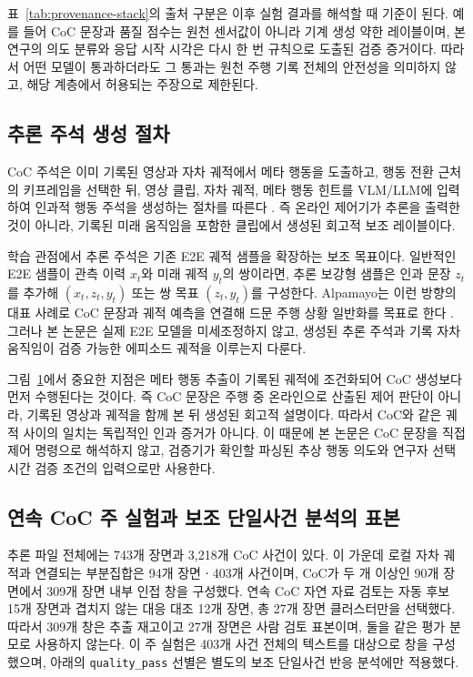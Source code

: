 표~\ref{tab:provenance-stack}의 출처 구분은 이후 실험 결과를 해석할 때 기준이 된다. 예를 들어 CoC 문장과 품질 점수는 원천 센서값이 아니라 기계 생성 약한 레이블이며, 본 연구의 의도 분류와 응답 시작 시각은 다시 한 번 규칙으로 도출된 검증 증거이다. 따라서 어떤 모델이 통과하더라도 그 통과는 원천 주행 기록 전체의 안전성을 의미하지 않고, 해당 계층에서 허용되는 주장으로 제한된다.

\subsection{추론 주석 생성 절차}
CoC 주석은 이미 기록된 영상과 자차 궤적에서 메타 행동을 도출하고, 행동 전환 근처의 키프레임을 선택한 뒤, 영상 클립, 자차 궤적, 메타 행동 힌트를 VLM/LLM에 입력하여 인과적 행동 주석을 생성하는 절차를 따른다 \cite{nvidia2026autolabeler}. 즉 온라인 제어기가 추론을 출력한 것이 아니라, 기록된 미래 움직임을 포함한 클립에서 생성된 회고적 보조 레이블이다.

\begin{figure}[t]
\centering

\label{fig:annotation-flow}
\end{figure}

학습 관점에서 추론 주석은 기존 E2E 궤적 샘플을 확장하는 보조 목표이다. 일반적인 E2E 샘플이 관측 이력 $x_t$와 미래 궤적 $y_t$의 쌍이라면, 추론 보강형 샘플은 인과 문장 $z_t$를 추가해 $(x_t,z_t,y_t)$ 또는 쌍 목표 $(z_t,y_t)$를 구성한다. Alpamayo는 이런 방향의 대표 사례로 CoC 문장과 궤적 예측을 연결해 드문 주행 상황 일반화를 목표로 한다 \cite{wang2025alpamayo}. 그러나 본 논문은 실제 E2E 모델을 미세조정하지 않고, 생성된 추론 주석과 기록 자차 움직임이 검증 가능한 에피소드 궤적을 이루는지 다룬다.

그림~\ref{fig:annotation-flow}에서 중요한 지점은 메타 행동 추출이 기록된 궤적에 조건화되어 CoC 생성보다 먼저 수행된다는 것이다. 즉 CoC 문장은 주행 중 온라인으로 산출된 제어 판단이 아니라, 기록된 영상과 궤적을 함께 본 뒤 생성된 회고적 설명이다. 따라서 CoC와 같은 궤적 사이의 일치는 독립적인 인과 증거가 아니다. 이 때문에 본 논문은 CoC 문장을 직접 제어 명령으로 해석하지 않고, 검증기가 확인할 파싱된 추상 행동 의도와 연구자 선택 시간 검증 조건의 입력으로만 사용한다.

\subsection{연속 CoC 주 실험과 보조 단일사건 분석의 표본}
추론 파일 전체에는 743개 장면과 3,218개 CoC 사건이 있다. 이 가운데 로컬 자차 궤적과 연결되는 부분집합은 94개 장면ㆍ403개 사건이며, CoC가 두 개 이상인 90개 장면에서 309개 장면 내부 인접 창을 구성했다. 연속 CoC 자연 자료 검토는 자동 후보 15개 장면과 겹치지 않는 대응 대조 12개 장면, 총 27개 장면 클러스터만을 선택했다. 따라서 309개 창은 추출 재고이고 27개 장면은 사람 검토 표본이며, 둘을 같은 평가 분모로 사용하지 않는다. 이 주 실험은 403개 사건 전체의 텍스트를 대상으로 창을 구성했으며, 아래의 \texttt{quality\_pass} 선별은 별도의 보조 단일사건 반응 분석에만 적용했다.

